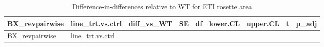 \documentclass[
  10pt,
]{article}
\begin{document}
\begin{longtable}[]{@{}
  >{\raggedright\arraybackslash}p{}
  >{\raggedright\arraybackslash}p{}
  >{\raggedleft\arraybackslash}p{}
  >{\raggedleft\arraybackslash}p{}
  >{\raggedleft\arraybackslash}p{}
  >{\raggedleft\arraybackslash}p{}
  >{\raggedleft\arraybackslash}p{}
  >{\raggedleft\arraybackslash}p{}
  >{\raggedleft\arraybackslash}p{}@{}}
\caption{Difference-in-differences relative to WT for ETI rosette
area}\tabularnewline
\toprule\noalign{}
\begin{minipage}[b]{\linewidth}\raggedright
BX\_revpairwise
\end{minipage} & \begin{minipage}[b]{\linewidth}\raggedright
line\_trt.vs.ctrl
\end{minipage} & \begin{minipage}[b]{\linewidth}\raggedleft
diff\_vs\_WT
\end{minipage} & \begin{minipage}[b]{\linewidth}\raggedleft
SE
\end{minipage} & \begin{minipage}[b]{\linewidth}\raggedleft
df
\end{minipage} & \begin{minipage}[b]{\linewidth}\raggedleft
lower.CL
\end{minipage} & \begin{minipage}[b]{\linewidth}\raggedleft
upper.CL
\end{minipage} & \begin{minipage}[b]{\linewidth}\raggedleft
t
\end{minipage} & \begin{minipage}[b]{\linewidth}\raggedleft
p\_adj
\end{minipage} \\
\midrule\noalign{}
\endfirsthead
\toprule\noalign{}
\begin{minipage}[b]{\linewidth}\raggedright
BX\_revpairwise
\end{minipage} & \begin{minipage}[b]{\linewidth}\raggedright
line\_trt.vs.ctrl
\end{minipage} & \begin{minipage}[b]{\linewidth}\raggedleft

\end{minipage}
\end{longtable}
\end{document}
